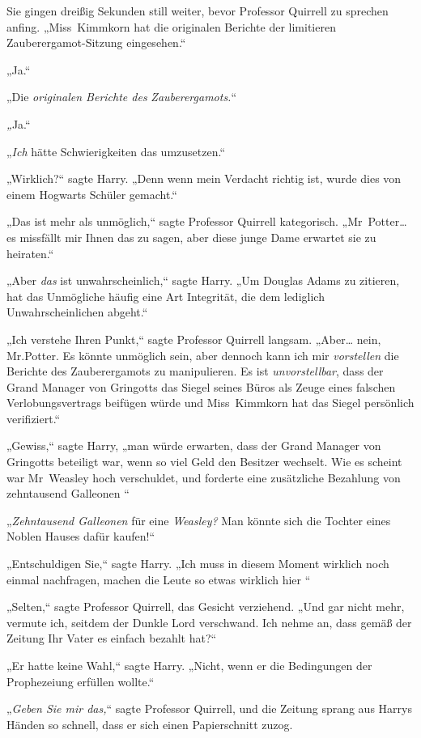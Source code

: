 {Sie gingen dreißig Sekunden still weiter, bevor Professor Quirrell zu sprechen anfing. „Miss~Kimmkorn hat die originalen Berichte der limitieren Zauberergamot-Sitzung eingesehen.“

„Ja.“

„Die \emph{originalen Berichte des} \emph{Zauberergamots.}“

\emph{„}Ja.“

„\emph{Ich} hätte Schwierigkeiten das umzusetzen.“

„Wirklich?“ sagte Harry. „Denn wenn mein Verdacht richtig ist, wurde dies von einem Hogwarts Schüler gemacht.“

„Das ist mehr als unmöglich,“ sagte Professor Quirrell kategorisch. „Mr~Potter… es missfällt mir Ihnen das zu sagen, aber diese junge Dame erwartet sie zu heiraten.“

„Aber \emph{das} ist unwahrscheinlich,“ sagte Harry. „Um Douglas Adams zu zitieren, hat das Unmögliche häufig eine Art Integrität, die dem lediglich Unwahrscheinlichen abgeht.“

„Ich verstehe Ihren Punkt,“ sagte Professor Quirrell langsam. „Aber… nein, Mr.Potter. Es könnte unmöglich sein, aber dennoch kann ich mir \emph{vorstellen} die Berichte des Zauberergamots zu manipulieren. Es ist \emph{unvorstellbar}, dass der Grand Manager von Gringotts das Siegel seines Büros als Zeuge eines falschen Verlobungsvertrags beifügen würde und Miss~Kimmkorn hat das Siegel persönlich verifiziert.“

„Gewiss,“ sagte Harry, „man würde erwarten, dass der Grand Manager von Gringotts beteiligt war, wenn so viel Geld den Besitzer wechselt. Wie es scheint war Mr~Weasley hoch verschuldet, und forderte eine zusätzliche Bezahlung von zehntausend Galleonen \later“

„\emph{Zehntausend Galleonen} für eine \emph{Weasley?} Man könnte sich die Tochter eines Noblen Hauses dafür kaufen!“

„Entschuldigen Sie,“ sagte Harry. „Ich muss in diesem Moment wirklich noch einmal nachfragen, machen die Leute so etwas wirklich hier \later“

„Selten,“ sagte Professor Quirrell, das Gesicht verziehend. „Und gar nicht mehr, vermute ich, seitdem der Dunkle Lord verschwand. Ich nehme an, dass gemäß der Zeitung Ihr Vater es einfach bezahlt hat?“

„Er hatte keine Wahl,“ sagte Harry. „Nicht, wenn er die Bedingungen der Prophezeiung erfüllen wollte.“

„\emph{Geben Sie mir das,}“ sagte Professor Quirrell, und die Zeitung sprang aus Harrys Händen so schnell, dass er sich einen Papierschnitt zuzog.

}
